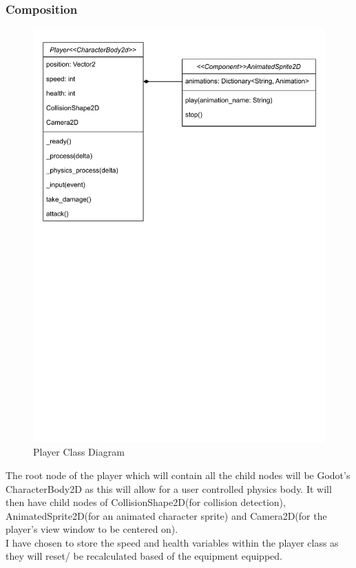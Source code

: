 \documentclass{article}
\begin{document}
        \subsubsection{Composition}
        \begin{figure}[H]
                \centering
                \includegraphics[width = 0.9\columnwidth, clip, trim = 0 450 0 0]{images/design/Player_Class_Diagram.pdf}
                \caption{Player Class Diagram}
                \label{fig:ie_6}
        \end{figure}
        The root node of the player which will contain all the child nodes will be Godot's CharacterBody2D as this will allow for a user controlled physics body. It will then have child nodes of CollisionShape2D(for collision detection), AnimatedSprite2D(for an animated character sprite) and Camera2D(for the player's view window to be centered on).\\
        I have chosen to store the speed and health variables within the player class as they will reset/ be recalculated based of the equipment equipped.\\
\end{document}
